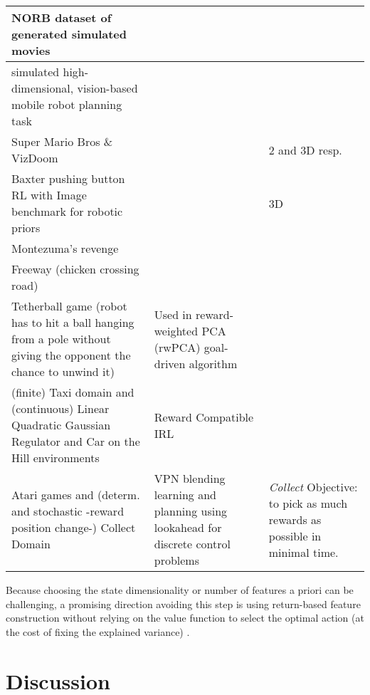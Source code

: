 \documentclass[a4paper]{article}
\begin{document}
\begin{table}[!htbp]
\begin{tabular}{p{49mm}|p{55mm}|p{55mm}}
NORB dataset of generated simulated movies & \cite{Goroshin15} & \\\hline
simulated high-dimensional, vision-based mobile robot planning task  & \cite{Boots09}   &  \\\hline
Super Mario Bros \& VizDoom & \cite{Pathak17} & 2 and 3D resp.\\\hline
Baxter pushing button RL with Image benchmark for robotic priors  & \cite{Lesort17}   & 3D \\\hline
Montezuma's revenge & \cite{Machado17a} & \\\hline
Freeway (chicken crossing road) & \cite{Machado17a} & \\\hline
Tetherball game (robot has to hit a ball hanging from a pole without giving the opponent the chance
to unwind it)  & Used in reward-weighted PCA (rwPCA) goal-driven algorithm \cite{Parisi17} & \\\hline
(finite) Taxi domain and (continuous) Linear Quadratic Gaussian Regulator and Car on the Hill environments & Reward Compatible IRL \cite{Metelli17} & \\\hline
Atari games and (determ. and stochastic -reward position change-) Collect Domain & VPN \cite{Oh17} blending learning and planning using lookahead for discrete control problems  & \textit{Collect} Objective: to pick as much rewards as possible in minimal time. \\\hline
\end{tabular}
\end{table}%

Because choosing the state dimensionality or number of features a priori can be challenging, a promising direction avoiding this step is using return-based feature construction without relying on the value function to select the optimal action (at the cost of fixing the explained variance) \cite{Parisi17}.


\section{Discussion}
\end{document}
